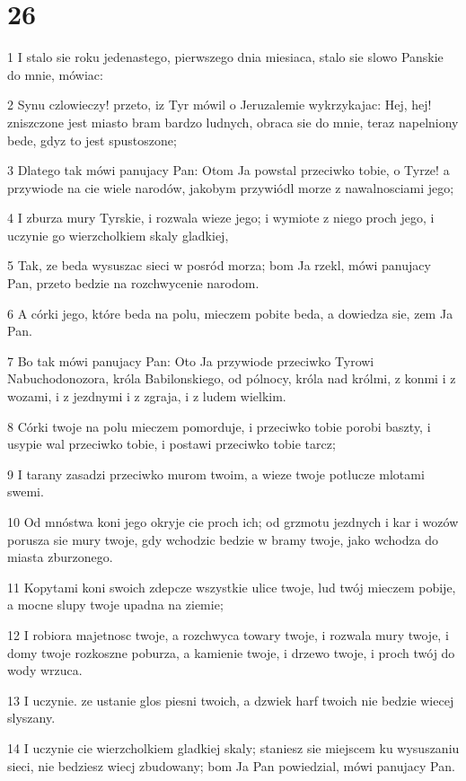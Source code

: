\chapter{26}

\par 1 I stalo sie roku jedenastego, pierwszego dnia miesiaca, stalo sie slowo Panskie do mnie, mówiac:
\par 2 Synu czlowieczy! przeto, iz Tyr mówil o Jeruzalemie wykrzykajac: Hej, hej! zniszczone jest miasto bram bardzo ludnych, obraca sie do mnie, teraz napelniony bede, gdyz to jest spustoszone;
\par 3 Dlatego tak mówi panujacy Pan: Otom Ja powstal przeciwko tobie, o Tyrze! a przywiode na cie wiele narodów, jakobym przywiódl morze z nawalnosciami jego;
\par 4 I zburza mury Tyrskie, i rozwala wieze jego; i wymiote z niego proch jego, i uczynie go wierzcholkiem skaly gladkiej,
\par 5 Tak, ze beda wysuszac sieci w posród morza; bom Ja rzekl, mówi panujacy Pan, przeto bedzie na rozchwycenie narodom.
\par 6 A córki jego, które beda na polu, mieczem pobite beda, a dowiedza sie, zem Ja Pan.
\par 7 Bo tak mówi panujacy Pan: Oto Ja przywiode przeciwko Tyrowi Nabuchodonozora, króla Babilonskiego, od pólnocy, króla nad królmi, z konmi i z wozami, i z jezdnymi i z zgraja, i z ludem wielkim.
\par 8 Córki twoje na polu mieczem pomorduje, i przeciwko tobie porobi baszty, i usypie wal przeciwko tobie, i postawi przeciwko tobie tarcz;
\par 9 I tarany zasadzi przeciwko murom twoim, a wieze twoje potlucze mlotami swemi.
\par 10 Od mnóstwa koni jego okryje cie proch ich; od grzmotu jezdnych i kar i wozów porusza sie mury twoje, gdy wchodzic bedzie w bramy twoje, jako wchodza do miasta zburzonego.
\par 11 Kopytami koni swoich zdepcze wszystkie ulice twoje, lud twój mieczem pobije, a mocne slupy twoje upadna na ziemie;
\par 12 I robiora majetnosc twoje, a rozchwyca towary twoje, i rozwala mury twoje, i domy twoje rozkoszne poburza, a kamienie twoje, i drzewo twoje, i proch twój do wody wrzuca.
\par 13 I uczynie. ze ustanie glos piesni twoich, a dzwiek harf twoich nie bedzie wiecej slyszany.
\par 14 I uczynie cie wierzcholkiem gladkiej skaly; staniesz sie miejscem ku wysuszaniu sieci, nie bedziesz wiecj zbudowany; bom Ja Pan powiedzial, mówi panujacy Pan.

